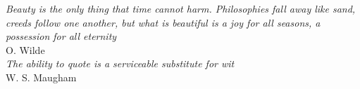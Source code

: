 \cleardoublepage
\thispagestyle{empty}


\vspace*{3cm}

\begin{raggedleft}
    \emph{Beauty is the only thing that time cannot harm. Philosophies fall away like sand, creeds follow one another, but what is beautiful is a joy for all seasons, a possession for all eternity} \\
    O. Wilde \\
    \vspace{5cm}
    \emph{The ability to quote is a serviceable substitute for wit} \\
    W. S. Maugham \\
\end{raggedleft}

\vspace{4cm}


